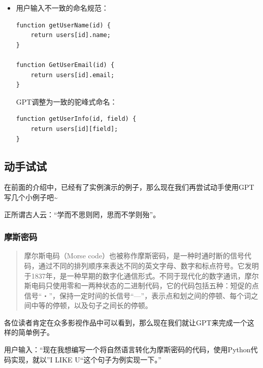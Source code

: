 \begin{enumerate}
        \begin{itemize}
          \item
                用户输入不一致的命名规范：

                \begin{lstlisting}
function getUserName(id) {
    return users[id].name;
}

function GetUserEmail(id) {
    return users[id].email;
}
\end{lstlisting}

                GPT调整为一致的驼峰式命名：

                \begin{lstlisting}
function getUserInfo(id, field) {
    return users[id][field];
}
\end{lstlisting}
        \end{itemize}
\end{enumerate}

\hypertarget{ux52a8ux624bux8bd5ux8bd5}{%
  \subsection{动手试试}\label{ux52a8ux624bux8bd5ux8bd5}}

在前面的介绍中，已经有了实例演示的例子，那么现在我们再尝试动手使用GPT写几个小例子吧\textasciitilde{}

正所谓古人云：``学而不思则罔，思而不学则殆''。

\hypertarget{ux6469ux65afux5bc6ux7801}{%
  \subsubsection{摩斯密码}\label{ux6469ux65afux5bc6ux7801}}

\begin{quote}
  摩尔斯电码（Morse
  code）也被称作摩斯密码，是一种时通时断的信号代码，通过不同的排列顺序来表达不同的英文字母、数字和标点符号。它发明于1837年，是一种早期的数字化通信形式。不同于现代化的数字通讯，摩尔斯电码只使用零和一两种状态的二进制代码，它的代码包括五种：短促的点信号``・''，保持一定时间的长信号``---''，表示点和划之间的停顿、每个词之间中等的停顿，以及句子之间长的停顿。
\end{quote}

各位读者肯定在众多影视作品中可以看到，那么现在我们就让GPT来完成一个这样的简单例子。

用户输入：``现在我想编写一个将自然语言转化为摩斯密码的代码，使用Python代码实现，就以''I
LIKE U``这个句子为例实现一下。''

